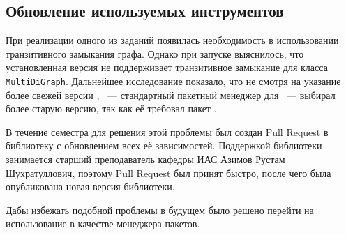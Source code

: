 
\subsection{Обновление используемых инструментов}
\label{subsec:housekeeping}

При реализации одного из заданий появилась необходимость в использовании транзитивного замыкания графа.
Однако при запуске выяснилось, что установленная версия \networkx{} не поддерживает транзитивное замыкание для класса \texttt{MultiDiGraph}.
Дальнейшее исследование показало, что не смотря на указание более свежей версии \networkx{}, \pip{}~--- стандартный пакетный менеджер для \python{}~--- выбирал более старую версию, так как её требовал пакет \cfpqdata{}.

В течение семестра для решения этой проблемы был создан Pull Request в библиотеку \cfpqdata{} с обновлением всех её зависимостей.
Поддержкой библиотеки занимается старший преподаватель кафедры ИАС Азимов Рустам Шухратуллович, поэтому Pull Request был принят быстро, после чего была опубликована новая версия библиотеки.

Дабы избежать подобной проблемы в будущем было решено перейти на использование \poetry{} в качестве менеджера пакетов.

